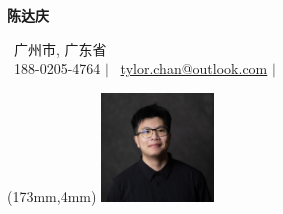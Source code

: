 \documentclass{cv}
\begin{document}
\begin{center}
    {\LARGE \textbf{陈达庆} \par}
    \vspace{4pt}
    \faMapMarker \ 广州市, 广东省 \\
    \vspace{3pt}
    \faPhone \ 188-0205-4764 $|$ \faEnvelope \ \href{mailto:tylor.chan@outlook.com}{tylor.chan@outlook.com} $|$  \href{https://github.com/TylorChan}{\faGithub}
\end{center}

\begin{textblock*}{3cm}(173mm,4mm) %
    \includegraphics[width=3cm]{headshot_1.jpg}
\end{textblock*}
\vspace{-5pt}
\end{document}
